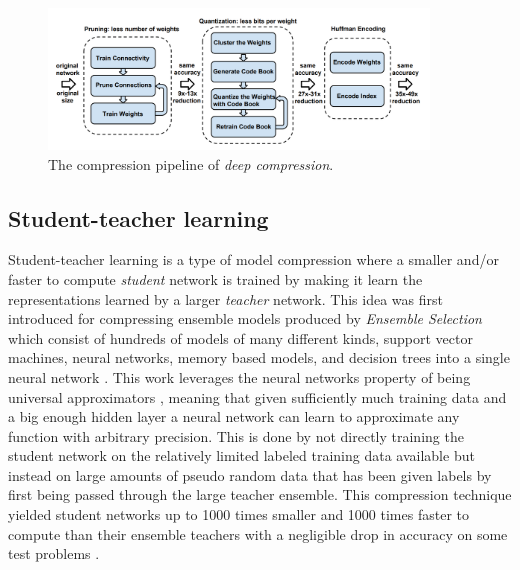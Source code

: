 \documentclass{kththesis}
\newcommand{\bibentry}[1]{\parencite{#1}}
\begin{document}
\begin{figure}[h]
  \centering
  \includegraphics[width=0.9\textwidth]{DeepCompression}
  \caption{The compression pipeline of \textit{deep compression}.}
  \label{fig:DeepCompression}
  \end{figure}

\subsection{Student-teacher learning}
Student-teacher learning is a type of model compression where a smaller and/or
faster to compute \emph{student} network is trained by making it learn the
representations learned by a larger \emph{teacher} network. This idea was first
introduced for compressing ensemble models produced by \emph{Ensemble Selection}
\bibentry{caruana2004ensemble} which consist of hundreds of models of many
different kinds, support vector machines, neural networks, memory based models,
and decision trees into a single neural network \bibentry{bucilua2006model}.
This work leverages the neural networks property of being universal
approximators \bibentry{cybenko1989approximation}, meaning that given
sufficiently much training data and a big enough hidden layer a neural network
can learn to approximate any function with arbitrary precision. This is done by not directly
training the student network on the relatively limited labeled training data
available but instead on large amounts of pseudo random data that has been given
labels by first being passed through the large teacher ensemble. This
compression technique yielded student networks up to 1000 times smaller and 1000
times faster to compute than their ensemble teachers with a negligible drop in accuracy
on some test problems \parencite{bucilua2006model}. 
\end{document}
